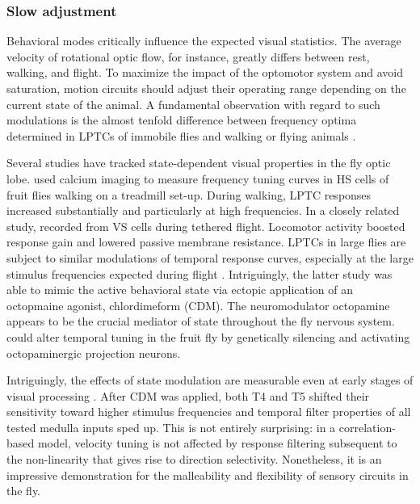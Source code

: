 \subsubsection{Slow adjustment}
Behavioral modes critically influence the expected visual statistics. The average velocity of rotational optic flow, for instance, greatly differs between rest, walking, and flight. To maximize the impact of the optomotor system and avoid saturation, motion circuits should adjust their operating range depending on the current state of the animal. A fundamental observation with regard to such modulations is the almost tenfold difference between frequency optima determined in LPTCs of immobile flies and walking or flying animals \citep{Joesch:2008fo,Duistermars:2007aa}.

Several studies have tracked state-dependent visual properties in the fly optic lobe. \citet{Chiappe:2010cl} used calcium imaging to measure frequency tuning curves in HS cells of fruit flies walking on a treadmill set-up. During walking, LPTC responses increased substantially and particularly at high frequencies. In a closely related study, \citet{Maimon:2010jy} recorded from VS cells during tethered flight. Locomotor activity boosted response gain and lowered passive membrane resistance. LPTCs in large flies are subject to similar modulations of temporal response curves, especially at the large stimulus frequencies expected during flight \citep{Jung:2011bc}. Intriguingly, the latter study was able to mimic the active behavioral state via ectopic application of an octopmaine agonist, chlordimeform (CDM). The neuromodulator octopamine appears to be the crucial mediator of state throughout the fly nervous system. \citet{Suver:2012bya} could alter temporal tuning in the fruit fly by genetically silencing and activating octopaminergic projection neurons.

Intriguingly, the effects of state modulation are measurable even at early stages of visual processing \citep{Arenz:2017aa}. After CDM was applied, both T4 and T5 shifted their sensitivity toward higher stimulus frequencies and temporal filter properties of all tested medulla inputs sped up. This is not entirely surprising: in a correlation-based model, velocity tuning is not affected by response filtering subsequent to the non-linearity that gives rise to direction selectivity. Nonetheless, it is an impressive demonstration for the malleability and flexibility of sensory circuits in the fly.

